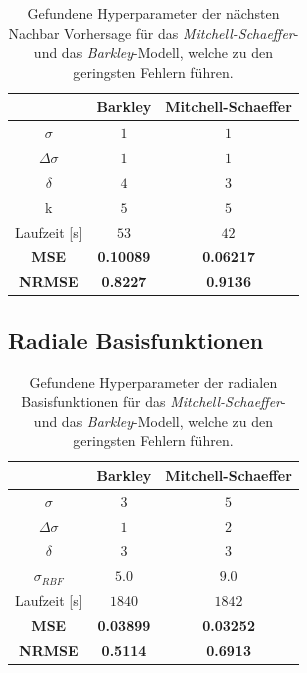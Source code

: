 \begin{table}[h]
	\centering

	\begin{tabular}{|c|c|c|}
		\multicolumn{1}{c|}{} & Barkley & Mitchell-Schaeffer \\ 
		\hline \hline 
		\rule[-1ex]{0pt}{2.5ex} $\sigma$ & $1$ & $1$ \\ 
		\hline 
		\rule[-1ex]{0pt}{2.5ex} $\Delta \sigma$ & $1$ & $1$ \\ 
		\hline 
		\rule[-1ex]{0pt}{2.5ex} $\delta$ & $4$ & $3$ \\ 
		\hline 
		\rule[-1ex]{0pt}{2.5ex} k & $5$ & $5$ \\ 
		\hline 
		\rule[-1ex]{0pt}{2.5ex} Laufzeit [s] & $53$ & $42$ \\ 
		\hline 
		\rule[-1ex]{0pt}{2.5ex} \textbf{MSE} & \textbf{0.10089} & \textbf{0.06217} \\ 
		\hline 
		\rule[-1ex]{0pt}{2.5ex} \textbf{NRMSE} & \textbf{0.8227} & \textbf{0.9136} \\ 
		\hline 
	\end{tabular} 

	\caption{Gefundene Hyperparameter der nächsten Nachbar Vorhersage für das \textit{Mitchell-Schaeffer}- und das \textit{Barkley}-Modell, welche zu den geringsten Fehlern führen.}
\label{tab:exp_unblur_nn_results}
\end{table} 


\FloatBarrier
\subsection{Radiale Basisfunktionen}


\begin{table}[h]
	\centering

	\begin{tabular}{|c|c|c|}
		\multicolumn{1}{c|}{} & Barkley & Mitchell-Schaeffer \\ 
		\hline \hline 
		\rule[-1ex]{0pt}{2.5ex} $\sigma$ & $3$ & $5$ \\ 
		\hline 
		\rule[-1ex]{0pt}{2.5ex} $\Delta \sigma$ & $1$ & $2$ \\ 
		\hline 
		\rule[-1ex]{0pt}{2.5ex} $\delta$ & $3$ & $3$ \\ 
		\hline 
		\rule[-1ex]{0pt}{2.5ex} $\sigma_{RBF}$ & $5.0$ & $9.0$ \\ 
		\hline 
		\rule[-1ex]{0pt}{2.5ex} Laufzeit [s] & $1840$ & $1842$ \\ 
		\hline 
		\rule[-1ex]{0pt}{2.5ex} \textbf{MSE} & \textbf{0.03899} & \textbf{0.03252} \\ 
		\hline 
		\rule[-1ex]{0pt}{2.5ex} \textbf{NRMSE} & \textbf{0.5114} & \textbf{0.6913} \\ 
		\hline 
	\end{tabular} 
	\caption{Gefundene Hyperparameter der radialen Basisfunktionen für das \textit{Mitchell-Schaeffer}- und das \textit{Barkley}-Modell, welche zu den geringsten Fehlern führen.}
	\label{tab:exp_unblur_rbf_results}
\end{table} 



